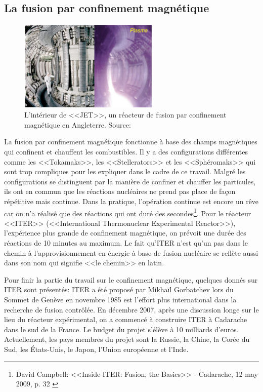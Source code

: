 \documentclass[12pt,a4paper]{article}
\begin{document}
\subsection{La fusion par confinement magnétique}
\begin{figure}[htb]
	\centering \includegraphics[width=0.6\textwidth]{images/jet}
	\caption{L'intérieur de <<JET>>, un réacteur de fusion par confinement magnétique en Angleterre. Source: \cite{iterheini}}
\end{figure}
La fusion par confinement magnétique fonctionne à base des champs magnétiques qui confinent et chauffent les combustibles. Il y a des configurations différentes comme les <<Tokamaks>>, les <<Stellerators>> et les <<Sphéromaks>> qui sont trop compliques pour les expliquer dans le cadre de ce travail. Malgré les configurations se distinguent par la manière de confiner et chauffer les particules, ils ont en commun que les réactions nucléaires ne prend pas place de façon répétitive mais continue. Dans la pratique, l'opération continue est encore un rêve car on n'a réalisé que des réactions qui ont duré des secondes\footnote{David Campbell: <<Inside ITER: Fusion, the Basics>> - Cadarache, 12 may 2009, p. 32 \cite{iterheini}}. Pour le réacteur <<ITER>> (<<International Thermonuclear Experimental Reactor>>), l'expérience plus grande de confinement magnétique, on prévoit une durée des réactions de 10 minutes au maximum. Le fait qu'ITER n'est qu'un pas dans le chemin à l'approvisionnement en énergie à base de fusion nucléaire se reflète aussi dans son nom qui signifie <<le chemin>> en latin.

Pour finir la partie du travail sur le confinement magnétique, quelques donnés sur ITER sont présentés: ITER a été proposé par Mikhaïl Gorbatchev lors du Sommet de Genève en novembre 1985 est l'effort plus international dans la recherche de fusion contrôlée. En décembre 2007, après une discussion longe sur le lieu du réacteur expérimental, on a commencé à construire ITER à Cadarache dans le sud de la France. Le budget du projet s'élève à 10 milliards d'euros. Actuellement, les pays membres du projet sont la Russie,
la Chine,
la Corée du Sud,
les États-Unis,
le Japon,
l'Union européenne et
l'Inde.
\end{document}
